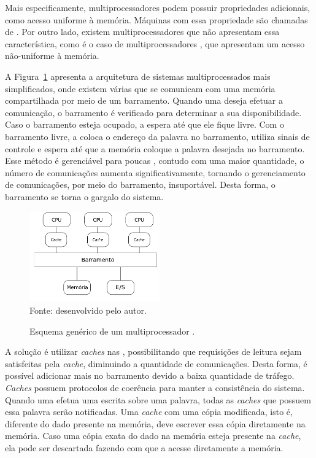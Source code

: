 Mais especificamente, multiprocessadores podem possuir propriedades adicionais,
como acesso uniforme à memória. Máquinas com essa propriedade são chamadas de
\uma. Por outro lado, existem multiprocessadores que não apresentam essa
característica, como é o caso de multiprocessadores \numa, que apresentam um acesso
não-uniforme à memória.

A Figura~\ref{fig:uma} apresenta a arquitetura de sistemas multiprocessados \uma
mais simplificados, onde existem várias \cpus que se
comunicam com uma memória compartilhada por meio de um barramento. Quando uma
\cpu deseja efetuar a comunicação, o barramento é verificado para
determinar a sua disponibilidade. Caso o barramento esteja ocupado, a
\cpu espera até que ele fique livre. Com o barramento livre, a \cpu
coloca o endereço da palavra no barramento, utiliza sinais de
controle e espera até que a memória coloque a palavra desejada no barramento. Esse
método é gerenciável para poucas \cpus, contudo com uma maior quantidade, o
número de comunicações aumenta significativamente, tornando
o gerenciamento de comunicações, por meio do barramento, insuportável. Desta
forma, o barramento se torna o gargalo do sistema.

\begin{figure}[t]
	\centering
    \caption{Esquema genérico de um multiprocessador \uma.}
    \includegraphics[width=0.5\textwidth]{figs/multiproc.pdf} \\
    Fonte: desenvolvido pelo autor.
    \label{fig:uma}
\end{figure}

A solução é utilizar \textit{caches} nas \cpus, possibilitando que requisições
de leitura sejam satisfeitas pela \textit{cache}, diminuindo a quantidade de
comunicações. Desta forma, é possível adicionar mais \cpus no barramento devido a baixa
quantidade de tráfego. \textit{Caches} possuem protocolos de coerência para
manter a consistência do sistema. Quando uma \cpu
efetua uma escrita sobre uma palavra, todas as \textit{caches} que possuem essa
palavra serão notificadas. Uma \textit{cache} com uma cópia modificada, isto é,
diferente do dado presente na memória, deve escrever essa cópia diretamente na
memória. Caso uma cópia exata do dado na memória esteja presente na
\textit{cache}, ela pode ser descartada fazendo com que a \cpu acesse
diretamente a memória.


